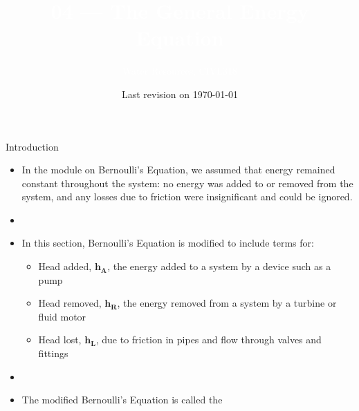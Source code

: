 \documentclass[9pt,xcolor={svgnames, x11names},professionalfonts, mathserif]{beamer}
\title[GEE]{\Huge \textcolor{white}{04 --- The General Energy Equation}}
\subtitle[CIVL318]{\Large\textcolor{white}{Water Resources, CIVL318}}
\author{}
\institute{}
\date{Last revision on \today}
\begin{document}

\begin{frame}[plain]    %
	\titlepage
\end{frame}



\begin{frame}{Introduction}
	\begin{itemize}
		\item In the module on Bernoulli's Equation, we assumed that energy remained constant throughout the system:
		      no energy was added to or removed from the system, and any losses due to friction were insignificant and could be ignored. \pause
		\item[]
		\item In this section, Bernoulli's Equation is modified to include terms for:
		      \begin{itemize}
		      	\item Head added, $\bm{h_A}$, the energy added to a system by a device such as a pump
		      	\item Head removed, $\bm{h_R}$, the energy removed from a system by a turbine or fluid motor
		      	\item Head lost, $\bm{h_L}$, due to friction in pipes and flow through valves and fittings
		      \end{itemize}	\pause
		\item[]
		\item The modified Bernoulli's Equation is called the 
	\end{itemize}
	
\end{frame}


\end{document}
